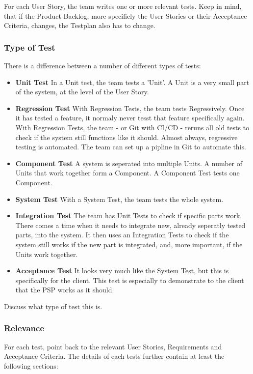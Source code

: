 \documentclass[10pt]{report}
\begin{document}
For each User Story, the team writes one or more relevant tests. Keep in mind, that if the Product Backlog, more specificly the User Stories or their Acceptance Criteria, changes, the Testplan also has to change. 

\subsubsection{Type of Test}
There is a difference between a number of different types of tests:

\begin{itemize}
	\item \textbf{Unit Test} In a Unit test, the team tests a 'Unit'. A Unit is a very small part of the system, at the level of the User Story.
	\item \textbf{Regression Test} With Regression Tests, the team tests Regressively. Once it has tested a feature, it normaly never tesst that feature specifically again. With Regression Tests, the team - or Git with CI/CD - reruns all old tests to check if the system still functions like it should. Almost always, regressive testing is automated. The team can set up a pipline in Git to automate this.
	\item \textbf{Component Test} A system is seperated into multiple Units. A number of Units that work together form a Component. A Component Test tests one Component.
	\item \textbf{System Test} With a System Test, the team tests the whole system.
	\item \textbf{Integration Test} The team has Unit Tests to check if specific parts work. There comes a time when it needs to integrate new, already seperatly tested parts, into the system. It then uses an Integration Tests to check if the system still works if the new part is integrated, and, more important, if the Units work together.
	\item \textbf{Acceptance Test} It looks very much like the System Test, but this is specifically for the client. This test is especially to demonstrate to the client that the PSP works as it should.
\end{itemize}

Discuss what type of test this is.

\subsubsection{Relevance}

For each test, point back to the relevant User Stories, Requirements and Acceptance Criteria. The details of each tests further contain at least the following sections:
\end{document}
